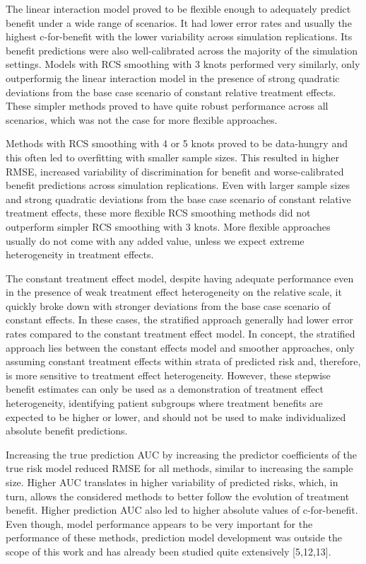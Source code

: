 \documentclass{article}
\begin{document}
The linear interaction model proved to be flexible enough to adequately
predict benefit under a wide range of scenarios. It had lower error
rates and usually the highest c-for-benefit with the lower variability
across simulation replications. Its benefit predictions were also
well-calibrated across the majority of the simulation settings. Models
with RCS smoothing with 3 knots performed very similarly, only
outperformig the linear interaction model in the presence of strong
quadratic deviations from the base case scenario of constant relative
treatment effects. These simpler methods proved to have quite robust
performance across all scenarios, which was not the case for more
flexible approaches.

Methods with RCS smoothing with 4 or 5 knots proved to be data-hungry
and this often led to overfitting with smaller sample sizes. This
resulted in higher RMSE, increased variability of discrimination for
benefit and worse-calibrated benefit predictions across simulation
replications. Even with larger sample sizes and strong quadratic
deviations from the base case scenario of constant relative treatment
effects, these more flexible RCS smoothing methods did not outperform
simpler RCS smoothing with 3 knots. More flexible approaches usually do
not come with any added value, unless we expect extreme heterogeneity in
treatment effects.

The constant treatment effect model, despite having adequate performance
even in the presence of weak treatment effect heterogeneity on the
relative scale, it quickly broke down with stronger deviations from the
base case scenario of constant effects. In these cases, the stratified
approach generally had lower error rates compared to the constant
treatment effect model. In concept, the stratified approach lies between
the constant effects model and smoother approaches, only assuming
constant treatment effects within strata of predicted risk and,
therefore, is more sensitive to treatment effect heterogeneity. However,
these stepwise benefit estimates can only be used as a demonstration of
treatment effect heterogeneity, identifying patient subgroups where
treatment benefits are expected to be higher or lower, and should not be
used to make individualized absolute benefit predictions.

Increasing the true prediction AUC by increasing the predictor
coefficients of the true risk model reduced RMSE for all methods,
similar to increasing the sample size. Higher AUC translates in higher
variability of predicted risks, which, in turn, allows the considered
methods to better follow the evolution of treatment benefit. Higher
prediction AUC also led to higher absolute values of c-for-benefit. Even
though, model performance appears to be very important for the
performance of these methods, prediction model development was outside
the scope of this work and has already been studied quite extensively
{[}5,12,13{]}.
\end{document}
